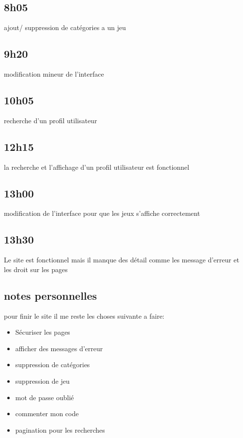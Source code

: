 \documentclass[a4paper,12pt,french]{sphinxmanual}
\begin{document}
\subsection{8h05}
\label{\detokenize{logbook:id35}}
\sphinxAtStartPar
ajout/ suppression de catégories a un jeu


\subsection{9h20}
\label{\detokenize{logbook:id36}}
\sphinxAtStartPar
modification mineur de l’interface


\subsection{10h05}
\label{\detokenize{logbook:id37}}
\sphinxAtStartPar
recherche d’un profil utilisateur


\subsection{12h15}
\label{\detokenize{logbook:h15}}
\sphinxAtStartPar
la recherche et l’affichage d’un profil utilisateur est fonctionnel


\subsection{13h00}
\label{\detokenize{logbook:id38}}
\sphinxAtStartPar
modification de l’interface pour que les jeux s’affiche correctement


\subsection{13h30}
\label{\detokenize{logbook:id39}}
\sphinxAtStartPar
Le site est fonctionnel mais il manque des détail comme les message d’erreur et les droit sur les pages


\subsection{notes personnelles}
\label{\detokenize{logbook:id40}}
\sphinxAtStartPar
pour finir le site il me reste les choses suivante a faire:
\begin{itemize}
\item {} 
\sphinxAtStartPar
Sécuriser les pages

\item {} 
\sphinxAtStartPar
afficher des messages d’erreur

\item {} 
\sphinxAtStartPar
suppression de catégories

\item {} 
\sphinxAtStartPar
suppression de jeu

\item {} 
\sphinxAtStartPar
mot de passe oublié

\item {} 
\sphinxAtStartPar
commenter mon code

\item {} 
\sphinxAtStartPar
pagination pour les recherches

\end{itemize}
\end{document}
